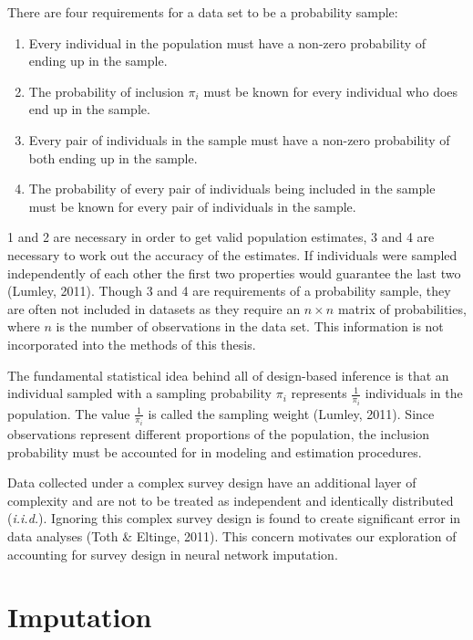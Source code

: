 \documentclass[12pt,twoside]{reedthesis}
\begin{document}
There are four requirements for a data set to be a probability sample:
\begin{enumerate}
\def\labelenumi{\arabic{enumi}.}
\item
  Every individual in the population must have a non-zero probability of
  ending up in the sample.
\item
  The probability of inclusion \(\pi_i\) must be known for every
  individual who does end up in the sample.
\item
  Every pair of individuals in the sample must have a non-zero
  probability of both ending up in the sample.
\item
  The probability of every pair of individuals being included in the
  sample must be known for every pair of individuals in the sample.
\end{enumerate}
1 and 2 are necessary in order to get valid population estimates, 3 and
4 are necessary to work out the accuracy of the estimates. If
individuals were sampled independently of each other the first two
properties would guarantee the last two (Lumley, 2011). Though 3 and 4
are requirements of a probability sample, they are often not included in
datasets as they require an \(n \times n\) matrix of probabilities,
where \(n\) is the number of observations in the data set. This
information is not incorporated into the methods of this thesis.

The fundamental statistical idea behind all of design-based inference is
that an individual sampled with a sampling probability \(\pi_i\)
represents \(\frac{1}{\pi_i}\) individuals in the population. The value
\(\frac{1}{\pi_i}\) is called the sampling weight (Lumley, 2011). Since
observations represent different proportions of the population, the
inclusion probability must be accounted for in modeling and estimation
procedures.

Data collected under a complex survey design have an additional layer of
complexity and are not to be treated as independent and identically
distributed (\emph{i.i.d.}). Ignoring this complex survey design is
found to create significant error in data analyses (Toth \& Eltinge,
2011). This concern motivates our exploration of accounting for survey
design in neural network imputation.

\section{Imputation}\label{imputation}
\end{document}
